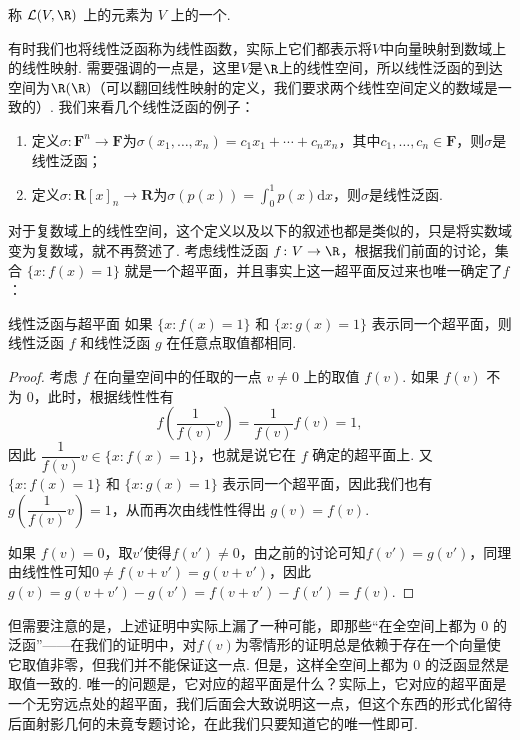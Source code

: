 \begin{definition}{}{}
    称 $\mathcal{L}(V, \R)$ 上的元素为 $V$ 上的一个.
\end{definition}
有时我们也将线性泛函称为线性函数，实际上它们都表示将$V$中向量映射到数域上的线性映射. 需要强调的一点是，这里$V$是$\R$上的线性空间，所以线性泛函的到达空间为$\R(\R)$（可以翻回线性映射的定义，我们要求两个线性空间定义的数域是一致的）. 我们来看几个线性泛函的例子：
\begin{enumerate}
    \item 定义$\sigma:\mathbf{F}^n\to\mathbf{F}$为$\sigma(x_1,\ldots,x_n)=c_1x_1+\cdots+c_nx_n$，其中$c_1,\ldots,c_n\in\mathbf{F}$，则$\sigma$是线性泛函；

    \item 定义$\sigma:\mathbf{R}[x]_n\to\mathbf{R}$为$\sigma(p(x))=\displaystyle\int_0^1p(x)\mathrm{d}x$，则$\sigma$是线性泛函.
\end{enumerate}

对于复数域上的线性空间，这个定义以及以下的叙述也都是类似的，只是将实数域变为复数域，就不再赘述了. 考虑线性泛函 $f\colon V \to \R$，根据我们前面的讨论，集合 $\{x: f(x) = 1\}$ 就是一个超平面，并且事实上这一超平面反过来也唯一确定了$f$：

\begin{lemma}{}{线性泛函与超平面}
    如果 $\{x: f(x) = 1\}$ 和 $\{x: g(x) = 1\}$ 表示同一个超平面，则线性泛函 $f$ 和线性泛函 $g$ 在任意点取值都相同.
\end{lemma}

\begin{proof}
    考虑 $f$ 在向量空间中的任取的一点 $v \neq 0$ 上的取值 $f(v)$. 如果 $f(v)$ 不为 $0$，此时，根据线性性有
    \[f\left(\dfrac{1}{f(v)}v\right)=\dfrac{1}{f(v)}f(v)=1,\]
    因此 $\dfrac{1}{f(v)}v \in \{x: f(x) = 1\}$，也就是说它在 $f$ 确定的超平面上. 又$\{x: f(x) = 1\}$ 和 $\{x: g(x) = 1\}$ 表示同一个超平面，因此我们也有 $g\left(\dfrac{1}{f(v)} v\right) = 1$，从而再次由线性性得出 $g(v) = f(v)$.

    如果 $f(v)=0$，取$v'$使得$f(v')\neq 0$，由之前的讨论可知$f(v')=g(v')$，同理由线性性可知$0\neq f(v+v')=g(v+v')$，因此$g(v)=g(v+v')-g(v')=f(v+v')-f(v')=f(v)$.
\end{proof}

但需要注意的是，上述证明中实际上漏了一种可能，即那些``在全空间上都为 $0$ 的泛函''——在我们的证明中，对$f(v)$为零情形的证明总是依赖于存在一个向量使它取值非零，但我们并不能保证这一点. 但是，这样全空间上都为 $0$ 的泛函显然是取值一致的. 唯一的问题是，它对应的超平面是什么？实际上，它对应的超平面是一个无穷远点处的超平面，我们后面会大致说明这一点，但这个东西的形式化留待后面射影几何的未竟专题讨论，在此我们只要知道它的唯一性即可.

